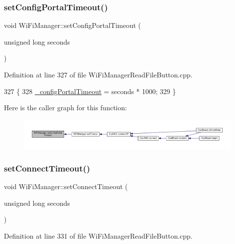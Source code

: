 \subsubsection{\texorpdfstring{set\+Config\+Portal\+Timeout()}{setConfigPortalTimeout()}}
{\footnotesize\ttfamily void Wi\+Fi\+Manager\+::set\+Config\+Portal\+Timeout (\begin{DoxyParamCaption}\item[{unsigned long}]{seconds }\end{DoxyParamCaption})}



Definition at line 327 of file Wi\+Fi\+Manager\+Read\+File\+Button.\+cpp.


\begin{DoxyCode}
327                                                               \{
328   \hyperlink{class_wi_fi_manager_ae6c969ba67e0a029dcde1c3511ca79b7}{\_configPortalTimeout} = seconds * 1000;
329 \}
\end{DoxyCode}
Here is the caller graph for this function\+:\nopagebreak
\begin{figure}[H]
\begin{center}
\leavevmode
\includegraphics[width=350pt]{d4/dc8/class_wi_fi_manager_a904006cb4d2c769e93bfdef336853766_icgraph}
\end{center}
\end{figure}
\mbox{\label{class_wi_fi_manager_a508fa98e77d165b29764f68d48b7a349}} 
\subsubsection{\texorpdfstring{set\+Connect\+Timeout()}{setConnectTimeout()}}
{\footnotesize\ttfamily void Wi\+Fi\+Manager\+::set\+Connect\+Timeout (\begin{DoxyParamCaption}\item[{unsigned long}]{seconds }\end{DoxyParamCaption})}



Definition at line 331 of file Wi\+Fi\+Manager\+Read\+File\+Button.\+cpp.


